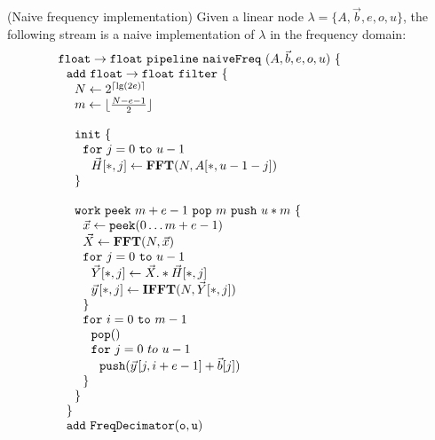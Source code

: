 \begin{transformation} (Naive frequency implementation)
Given a linear node $\lambda = \{A, {\vec b}, e, o, u\}$, the
following stream is a naive implementation of $\lambda$ in the
frequency domain: \\
\begin{equation} \nonumber
  \begin{array}{ll}
    {\tt float \rightarrow float}~{\tt pipeline~naiveFreq~}(A, {\vec b}, e, o, u){\tt ~\{} & \hspace{40pt}\\
    ~~{\tt add~float \rightarrow float~filter~\{}\\
    ~~~~N \leftarrow 2^{\lceil \lg(2e) \rceil} \\
    ~~~~m \leftarrow \lfloor \frac{N-e-1}{2} \rfloor \\
    \\
    ~~~~{\tt init}~{\tt \{} \\
    ~~~~~~{\tt for}~j=0~{\tt to}~u-1\\
    ~~~~~~~~\vec{H}[*,j] \leftarrow \mathbf{FFT}(N,A[*,u-1-j]) \\
    ~~~~{\tt \}} \\
    \\
    ~~~~{\tt work}~{\tt peek}~m+e-1~{\tt pop}~m~{\tt push}~u*m~{\tt \{} \\
    ~~~~~~\vec{x} \leftarrow {\tt peek}(0 \dots m+e-1 ) \\
    ~~~~~~\vec{X} \leftarrow \mathbf{FFT} (N, \vec{x}) \\
    ~~~~~~{\tt for}~j=0~{\tt to}~u-1\\
    ~~~~~~~~\vec{Y}[*,j] \leftarrow \vec{X} .* \vec{H}[*,j] \\
    ~~~~~~~~\vec{y}\hspace{1pt}[*,j] \leftarrow \mathbf{IFFT}(N, \vec{Y}[*,j]) \\
    ~~~~~~{\tt \}} \\
    ~~~~~~{\tt for}~i=0~{\tt to}~m-1\\
    ~~~~~~~~{\tt pop()} \\
    ~~~~~~~~{\tt for}~j=0~to~u-1\\
    ~~~~~~~~~~{\tt push}(\vec{y}\hspace{1pt}[j,i+e-1] + {\vec b}[j])\\
    ~~~~~~{\tt \}} \\
    ~~~~{\tt \}} \\
    ~~{\tt \}} \\
    ~~{\tt add~FreqDecimator(o, u)} \\

\end{array}
\end{equation}
\end{transformation}
